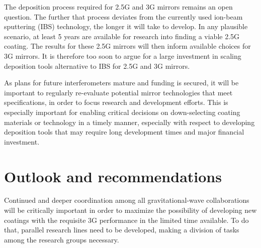 The deposition process required for 2.5G and 3G mirrors remains an open question. The further that process deviates from the currently used ion-beam sputtering (IBS) technology, the longer it will take to develop. In any plausible scenario, at least 5 years are available for research into finding a viable 2.5G coating. The results for these 2.5G mirrors will then inform available choices for 3G mirrors. It is therefore too soon to argue for a large investment in scaling deposition tools alternative to IBS for 2.5G and 3G mirrors.

As plans for future interferometers mature and funding is secured, it will be important to regularly re-evaluate potential mirror technologies that meet specifications, in order to focus research and development efforts. This is especially important for enabling critical decisions on down-selecting coating materials or technology in a timely manner, especially with respect to developing deposition tools that may require long development times and major financial investment.



\section{Outlook and recommendations}
\label{coatings_Recomm}

Continued and deeper coordination among all gravitational-wave collaborations will be critically important in order to maximize the possibility of developing new coatings with the requisite 3G performance in the limited time available. To do that, parallel research lines need to be developed, making a division of tasks among the research groups necessary.


